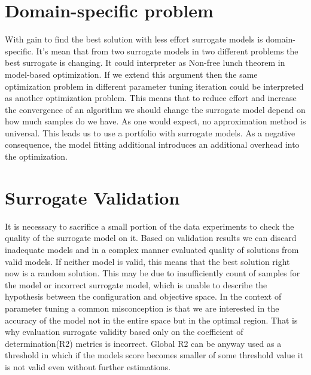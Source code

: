     \section{Domain-specific problem}
    With gain to find the best solution with less effort surrogate models is domain-specific. It's mean that from two surrogate models in two different problems the best surrogate is changing. It could interpreter as Non-free lunch theorem in model-based optimization. If we extend this argument then the same optimization problem in different parameter tuning iteration could be interpreted as another optimization problem. This means that to reduce effort and increase the convergence of an algorithm we should change the surrogate model depend on how much samples do we have. As one would expect, no approximation method is universal.
    This leads us to use a portfolio with surrogate models. As a negative consequence, the model fitting additional introduces an additional overhead into the optimization.
    

    \section{Surrogate Validation}
    It is necessary to sacrifice a small portion of the data experiments to check the quality of the surrogate model on it. Based on validation results we can discard inadequate models and in a complex manner evaluated quality of solutions from valid models. If neither model is valid, this means that the best solution right now is a random solution. This may be due to insufficiently count of samples for the model or incorrect surrogate model, which is unable to describe the hypothesis between the configuration and objective space. 
    In the context of parameter tuning a common misconception is that we are interested in the accuracy of the model not in the entire space but in the optimal region. That is why evaluation surrogate validity based only on the coefficient of determination(R2) metrics is incorrect. Global R2 can be anyway used as a threshold in which if the models score becomes smaller of some threshold value it is not valid even without further estimations. 


